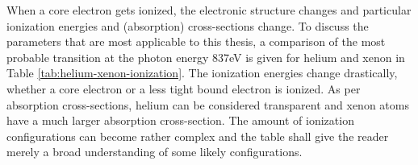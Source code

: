 When a core electron gets ionized, the electronic structure changes and particular ionization energies and (absorption) cross-sections change. To discuss the parameters that are most applicable to this thesis, a comparison of the most probable transition at the photon energy 837eV is given for helium and xenon in Table \ref{tab:helium-xenon-ionization}. The ionization energies change drastically, whether a core electron or a less tight bound electron is ionized. As per absorption cross-sections, helium can be considered transparent and xenon atoms have a much larger absorption cross-section. The amount of ionization configurations can become rather complex and the table shall give the reader merely a broad understanding of some likely configurations.\\
